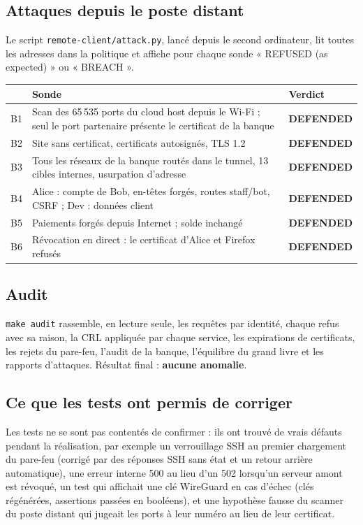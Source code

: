 \documentclass[11pt,a4paper]{article}
\newcommand{\cmd}[1]{\texttt{#1}}
\newcommand{\defended}{\textcolor{ok}{\textbf{DEFENDED}}}
\begin{document}
\subsection{Attaques depuis le poste distant}
Le script \cmd{remote-client/attack.py}, lancé depuis le second ordinateur, lit toutes les adresses
dans la politique et affiche pour chaque sonde « REFUSED (as expected) » ou « BREACH ».
\begin{center}
\begin{tabularx}{\linewidth}{@{}lL l@{}}
\toprule
& \textbf{Sonde} & \textbf{Verdict}\\
\midrule
B1 & Scan des 65\,535 ports du cloud host depuis le Wi-Fi ; seul le port partenaire présente le certificat de la banque & \defended\\
B2 & Site sans certificat, certificats autosignés, TLS 1.2 & \defended\\
B3 & Tous les réseaux de la banque routés dans le tunnel, 13 cibles internes, usurpation d'adresse & \defended\\
B4 & Alice : compte de Bob, en-têtes forgés, routes staff/bot, CSRF ; Dev : données client & \defended\\
B5 & Paiements forgés depuis Internet ; solde inchangé & \defended\\
B6 & Révocation en direct : le certificat d'Alice et Firefox refusés & \defended\\
\bottomrule
\end{tabularx}
\end{center}

\subsection{Audit}
\cmd{make audit} rassemble, en lecture seule, les requêtes par identité, chaque refus avec sa raison,
la CRL appliquée par chaque service, les expirations de certificats, les rejets du pare-feu, l'audit
de la banque, l'équilibre du grand livre et les rapports d'attaques. Résultat final :
\textbf{aucune anomalie}.

\subsection{Ce que les tests ont permis de corriger}
Les tests ne se sont pas contentés de confirmer : ils ont trouvé de vrais défauts pendant la
réalisation, par exemple un verrouillage SSH au premier chargement du pare-feu (corrigé par des
réponses SSH sans état et un retour arrière automatique), une erreur interne 500 au lieu d'un 502
lorsqu'un serveur amont est révoqué, un test qui affichait une clé WireGuard en cas d'échec (clés
régénérées, assertions passées en booléens), et une hypothèse fausse du scanner du poste distant
qui jugeait les ports à leur numéro au lieu de leur certificat.
\end{document}
